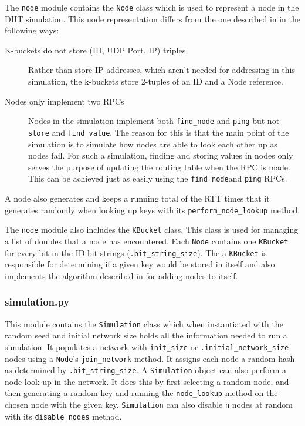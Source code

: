 \documentclass[notitlepage,12pt]{article}
\begin{document}
The \texttt{node}
 module contains the \texttt{Node}
class which is used to represent a node in the DHT
simulation. This node representation differs from the one described in
\cite{kademlia} in the following ways:
\begin{description}
\item[K-buckets do not store (ID, UDP Port, IP) triples] Rather than store IP
  addresses, which aren't needed for addressing in this simulation, the
  k-buckets store 2-tuples of an ID and a Node reference.
\item[Nodes only implement two RPCs] Nodes in the simulation implement both
\texttt{find\_node} and
\texttt{ping}
 but not
\texttt{store}
and \texttt{find\_value}. The reason for this is that the main point of the simulation is
  to simulate how nodes are able to look each other up as nodes fail. For such a
  simulation, finding and storing values in nodes only serves the purpose of
  updating the routing table when the RPC is made. This can be achieved just as
  easily using the \texttt{find\_node}and \texttt{ping}
 RPCs. 
\end{description}
A node also generates and keeps a running total of the RTT times that it
generates randomly when looking up keys with its \texttt{perform\_node\_lookup}
method. 

The \texttt{node}
 module also includes the \texttt{KBucket}
class. This class is used for managing a list of doubles that a
node has encountered. Each \texttt{Node}
 contains one \texttt{KBucket}
for every bit in the ID bit-strings (\texttt{.bit\_string\_size}). The a
\texttt{KBucket}
is responsible for determining if a given key would be stored in
itself and also implements the algorithm described in \cite[p. 5]{kademlia} for
adding nodes to itself. 

\subsubsection{simulation.py}
\label{sec:sim}
This module contains the \texttt{Simulation}
class which when instantiated with the random seed and initial network
size holds all the information needed to run
a simulation. It populates a network with
\texttt{init\_size} or \texttt{.initial\_network\_size} nodes using a \texttt{Node}'s
\texttt{join\_network}
method. It assigns each node a random hash as determined by
\texttt{.bit\_string\_size}. A
\texttt{Simulation}
 object can also perform a node look-up in the network. It does
this by first selecting a random node, and then generating a random key and
running the
\texttt{node\_lookup}
method on the chosen node with the given key. 
\texttt{Simulation}
can also disable
\texttt{n}
 nodes at random with its
\texttt{disable\_nodes}
method.
\end{document}

